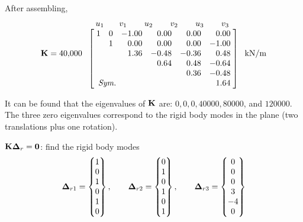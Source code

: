 After assembling,
\begin{equation}
  \Kmat = 40{,}000\;
  \begin{array}{c}
    \begin{array}{cccccc} \;u_1\; & \;\;v_1\;\; & \;\;u_2\;\; & \;\;v_2\;\; & \;\;u_3\;\; & \;\;v_3\;\; \end{array}\\
    \left[\begin{array}{@{\;}r@{\quad}r@{\quad}r@{\quad}r@{\quad}r@{\quad}r@{\;}}
      1 & 0 & -1.00 & 0.00 & 0.00 & 0.00\\
        & 1 &  0.00 & 0.00 & 0.00 & -1.00\\
        &   &  1.36 & -0.48 & -0.36 & 0.48\\
        &   &       & 0.64 & 0.48 & -0.64\\
        &   &       &      & 0.36 & -0.48\\
      \multicolumn{3}{l}{\textit{Sym.}} & & & 1.64
    \end{array}\right]
  \end{array}\;\text{kN/m}
\end{equation}
\begin{fig}
  
\end{fig}
It can be found that the eigenvalues of $\mathbf{K}$ are: $0, 0, 0, 40000, 80000$, and $120000$. The three zero eigenvalues correspond to the rigid body modes in the plane (two translations plus one rotation).

\noindent$\mathbf{K}\bm{\Delta}_r = \mathbf{0}$: find the rigid body modes
\begin{equation}
  \bm{\Delta}_{r1} = \begin{Bmatrix}1\\0\\1\\0\\1\\0\end{Bmatrix},\qquad
  \bm{\Delta}_{r2} = \begin{Bmatrix}0\\1\\0\\1\\0\\1\end{Bmatrix},\qquad
  \bm{\Delta}_{r3} = \begin{Bmatrix}0\\0\\0\\3\\-4\\0\end{Bmatrix}
\end{equation}
\begin{fig}
  
\end{fig}

